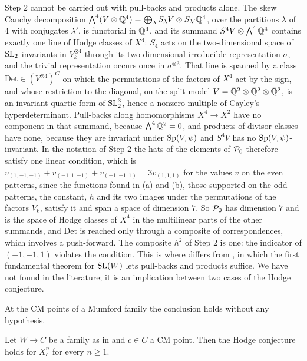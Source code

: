 \begin{remark}\label{rem:mumforddet}
Step 2 cannot be carried out with pull-backs and products alone. The skew
Cauchy decomposition $\bigwedge^{4}(V\otimes\mathbb{Q}^{4})=\bigoplus_{\lambda}
S_{\lambda}V\otimes S_{\lambda'}\mathbb{Q}^{4}$, over the partitions $\lambda$ of $4$
with conjugates $\lambda'$, is functorial in $\mathbb{Q}^{4}$, and its summand
$S^{4}V\otimes\bigwedge^{4}\mathbb{Q}^{4}$ contains exactly one line of Hodge classes
of $X^{4}$: $S_{4}$ acts on the two-dimensional space of $\operatorname{SL}_{2}$-invariants
in $V_{k}^{\otimes4}$ through its two-dimensional irreducible representation
$\sigma$, and the trivial representation occurs once in $\sigma^{\otimes3}$.
That line is spanned by a class $\mathrm{Det}\in(V^{\otimes4})^{G}$ on which
the permutations of the factors of $X^{4}$ act by the sign, and whose
restriction to the diagonal, on the split model
$V=\bar{\mathbb{Q}}^{2}\otimes\bar{\mathbb{Q}}^{2}\otimes\bar{\mathbb{Q}}^{2}$, is an invariant
quartic form of $\operatorname{SL}_{2}^{3}$, hence a nonzero multiple of Cayley's
hyperdeterminant. Pull-backs along homomorphisms
$X^{4}\to X^{2}$ have no component in that summand, because
$\bigwedge^{4}\mathbb{Q}^{2}=0$, and products of divisor classes have none, because
they are invariant under $\operatorname{Sp}(V,\psi)$ and $S^{4}V$ has no
$\operatorname{Sp}(V,\psi)$-invariant. In the notation of Step 2 the hats of the elements
of $\mathcal{P}_{0}$ therefore satisfy one linear condition, which is
$v_{(1,-1,-1)}+v_{(-1,1,-1)}+v_{(-1,-1,1)}=3v_{(1,1,1)}$ for the values $v$ on
the even patterns, since the functions found in (a) and (b), those supported
on the odd patterns, the constant, $h$ and its two images under the
permutations of the factors $V_{k}$, satisfy it and
span a space of dimension $7$. So $\mathcal{P}_{0}$ has dimension $7$ and is the space
of Hodge classes of $X^{4}$ in the multilinear parts of the other summands,
and $\mathrm{Det}$ is reached only through a composite of correspondences,
which involves a push-forward. The composite $h^{2}$ of Step 2 is one: the
indicator of $(-1,-1,1)$ violates the condition. This is where
 differs from , in which the first
fundamental theorem for $\operatorname{SL}(W)$ lets pull-backs and products suffice. We have
not found  in the literature; it is an implication
between two cases of the Hodge conjecture.
\end{remark}

At the CM points of a Mumford family the conclusion holds without any
hypothesis.

\begin{proposition}\label{prop:mumfordcmpowers}
Let $W\to C$ be a family as in  and $c\in C$ a CM
point. Then the Hodge conjecture holds for $X_{c}^{n}$ for every $n\ge1$.
\end{proposition}

